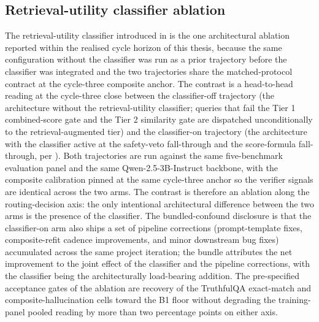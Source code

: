 \subsection{Retrieval-utility classifier ablation}
\label{sec:comp-ablations}
\label{sec:ruc-ablation}

The retrieval-utility classifier introduced in  is the one architectural ablation reported within the realised cycle horizon of this thesis, because the same configuration without the classifier was run as a prior trajectory before the classifier was integrated and the two trajectories share the matched-protocol contract at the cycle-three composite anchor. The contrast is a head-to-head reading at the cycle-three close between the classifier-off trajectory (the architecture without the retrieval-utility classifier; queries that fail the Tier 1 combined-score gate and the Tier 2 similarity gate are dispatched unconditionally to the retrieval-augmented tier) and the classifier-on trajectory (the architecture with the classifier active at the safety-veto fall-through and the score-formula fall-through, per ). Both trajectories are run against the same five-benchmark evaluation panel and the same Qwen-2.5-3B-Instruct backbone, with the composite calibration pinned at the same cycle-three anchor so the verifier signals are identical across the two arms. The contrast is therefore an ablation along the routing-decision axis: the only intentional architectural difference between the two arms is the presence of the classifier. The bundled-confound disclosure is that the classifier-on arm also ships a set of pipeline corrections (prompt-template fixes, composite-refit cadence improvements, and minor downstream bug fixes) accumulated across the same project iteration; the bundle attributes the net improvement to the joint effect of the classifier and the pipeline corrections, with the classifier being the architecturally load-bearing addition. The pre-specified acceptance gates of the ablation are recovery of the TruthfulQA exact-match and composite-hallucination cells toward the B1 floor without degrading the training-panel pooled reading by more than two percentage points on either axis.



